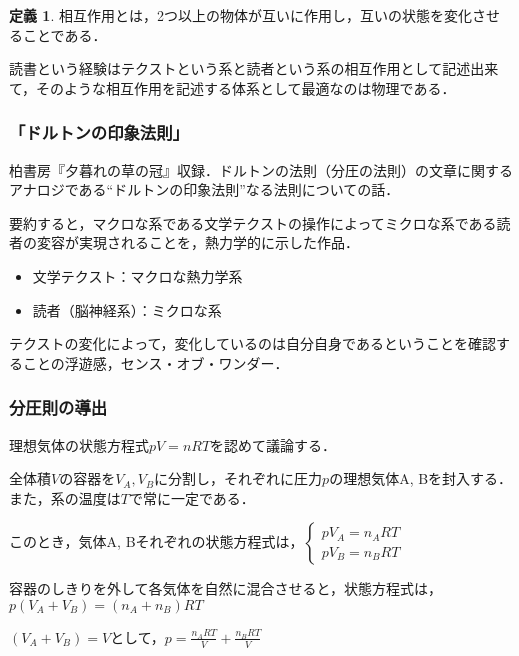 \documentclass[10pt, a5paper, twoside]{jsarticle}
\theoremstyle{definition}
\newtheorem{dfn}{定義}
\begin{document}
			\begin{dfn}

				相互作用とは，2つ以上の物体が互いに作用し，互いの状態を変化させることである．
			
			\end{dfn}

			読書という経験はテクストという系と読者という系の相互作用として記述出来て，そのような相互作用を記述する体系として最適なのは物理である．

			\subsubsection{「ドルトンの印象法則」}

				柏書房『夕暮れの草の冠』収録．ドルトンの法則（分圧の法則）の文章に関するアナロジである“ドルトンの印象法則”なる法則についての話．

				要約すると，マクロな系である文学テクストの操作によってミクロな系である読者の変容が実現されることを，熱力学的に示した作品．

				\begin{itemize}

					\item 文学テクスト：マクロな熱力学系

					\item 読者（脳神経系）：ミクロな系

				\end{itemize}

				テクストの変化によって，変化しているのは自分自身であるということを確認することの浮遊感，センス・オブ・ワンダー．

			\subsubsection*{分圧則の導出}

				理想気体の状態方程式$ pV = nRT $を認めて議論する．

				全体積$ V $の容器を$ V_A , V_B $に分割し，それぞれに圧力$ p $の理想気体A, Bを封入する．また，系の温度は$ T $で常に一定である．

				このとき，気体A, Bそれぞれの状態方程式は，$ \begin{cases} p V_A = n_A R T \\ p V_B = n_B R T \end{cases} $

				容器のしきりを外して各気体を自然に混合させると，状態方程式は，$ p (V_A + V_B) = (n_A + n_B) RT$

				$ (V_A + V_B) = V $として，$ p = \displaystyle \frac{n_A R T}{V} + \frac{n_B R T}{V} $
\end{document}
